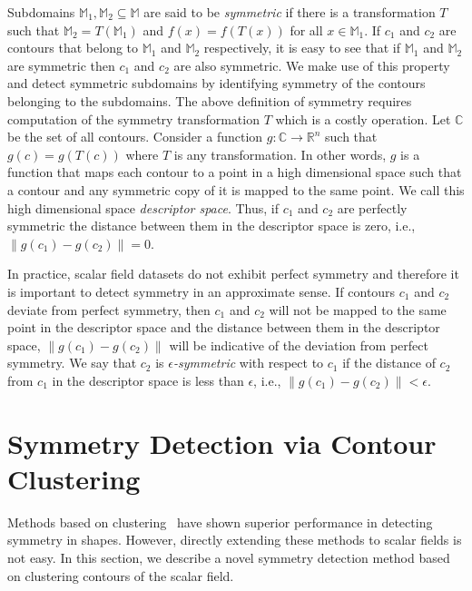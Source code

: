 \documentclass[review,journal]{vgtc}         %
\begin{document}
Subdomains $\mathbb{M}_1, \mathbb{M}_2 \subseteq \mathbb{M}$ are said to be \emph{symmetric} 
if there is a transformation $T$ such that ${\mathbb{M}_2=T(\mathbb{M}_1)}$ and 
${f(x)=f(T(x))}$ for all $x \in \mathbb{M}_1$. If $c_1$ and $c_2$ are contours that belong to 
$\mathbb{M}_1$ and $\mathbb{M}_2$ respectively, it is easy to see that if $\mathbb{M}_1$ and 
$\mathbb{M}_2$ are symmetric then $c_1$ and $c_2$ are also symmetric. We make use of this property
and detect symmetric subdomains by identifying symmetry of the contours belonging to
the subdomains. The above definition of symmetry requires computation of the symmetry 
transformation $T$ which is a costly operation. Let $\mathbb{C}$ be the set of all contours. 
Consider a function $g : \mathbb{C} \rightarrow \mathbb{R}^n$ such that $g(c) = g(T(c))$
where $T$ is any transformation. In other words, $g$ is a function that maps each
contour to a point in a high dimensional space such that a contour and any symmetric
copy of it is mapped to the same point. We call this high dimensional space
\emph{descriptor space}. Thus, if $c_1$ and $c_2$ are perfectly symmetric
the distance between them in the descriptor space is zero, i.e., 
$\lVert g(c_1)-g(c_2) \rVert = 0$. 

In practice, scalar field datasets do not exhibit perfect symmetry and therefore
it is important to detect symmetry in an approximate sense. If contours $c_1$ and 
$c_2$ deviate from perfect symmetry, then $c_1$ and $c_2$ will not be mapped
to the same point in the descriptor space and the distance between
them in the descriptor space, $\lVert g(c_1)-g(c_2) \rVert$ will be indicative
of the deviation from perfect symmetry. We say that $c_2$ is \emph{$\epsilon$-symmetric} 
with respect to $c_1$ if the distance of $c_2$ from $c_1$ in the descriptor 
space is less than $\epsilon$, i.e., $\lVert g(c_1)-g(c_2) \rVert < \epsilon$.
\section{Symmetry Detection via Contour Clustering}
Methods based on clustering~\cite{} have shown superior performance in detecting
symmetry in shapes. However, directly extending these methods to scalar fields
is not easy. In this section, we describe a novel symmetry detection method
based on clustering contours of the scalar field.
\end{document}
